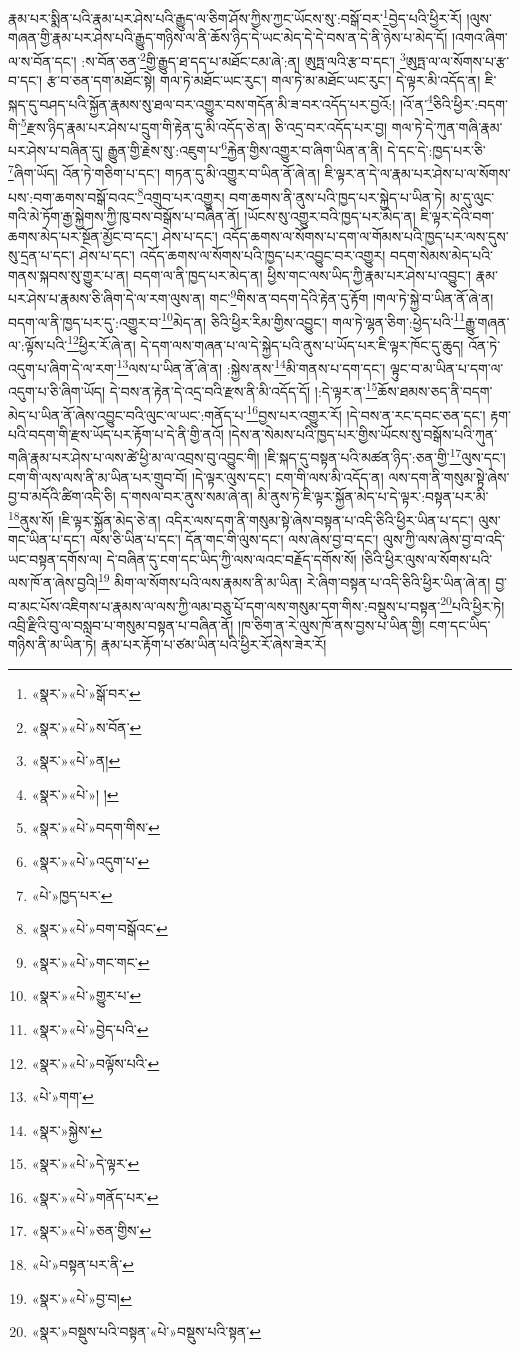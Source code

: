 རྣམ་པར་སྨིན་པའི་རྣམ་པར་ཤེས་པའི་རྒྱུད་ལ་ཅིག་ཤོས་ཀྱིས་ཀྱང་ཡོངས་སུ་:བསྒོ་བར་\footnote{«སྣར་»«པེ་»སྒོ་བར་}བྱེད་པའི་ཕྱིར་རོ། །ལུས་གཞན་གྱི་རྣམ་པར་ཤེས་པའི་རྒྱུད་གཉིས་ལ་ནི་ཆོས་ཉིད་དེ་ཡང་མེད་དེ་དེ་བས་ན་དེ་ནི་ཉེས་པ་མེད་དོ། །འགའ་ཞིག་ལ་ས་བོན་དང་། :ས་བོན་ཅན་\footnote{«སྣར་»«པེ་»ས་བོན་}གྱི་རྒྱུད་ཐ་དད་པ་མཐོང་ངམ་ཞེ་:ན། ཨུཏྤ་ལའི་རྩ་བ་དང་། \footnote{«སྣར་»«པེ་»ན།  }ཨུཏྤ་ལ་ལ་སོགས་པ་རྩ་བ་དང་། རྩ་བ་ཅན་དག་མཐོང་སྟེ། གལ་ཏེ་མཐོང་ཡང་རུང་། གལ་ཏེ་མ་མཐོང་ཡང་རུང་། དེ་ལྟར་མི་འདོད་ན། ཇི་སྐད་དུ་བཤད་པའི་སྐྱོན་རྣམས་སུ་ཐལ་བར་འགྱུར་བས་གདོན་མི་ཟ་བར་འདོད་པར་བྱའོ:། །འོ་ན་\footnote{«སྣར་»«པེ་»། །}ཅིའི་ཕྱིར་:བདག་གི་\footnote{«སྣར་»«པེ་»བདག་གིས་}རྫས་ཉིད་རྣམ་པར་ཤེས་པ་དྲུག་གི་རྟེན་དུ་མི་འདོད་ཅེ་ན། ཅི་འདྲ་བར་འདོད་པར་བྱ། གལ་ཏེ་དེ་ཀུན་གཞི་རྣམ་པར་ཤེས་པ་བཞིན་དུ། རྒྱུན་གྱི་རྗེས་སུ་:འཇུག་པ་\footnote{«སྣར་»«པེ་»འདུག་པ་}རྐྱེན་གྱིས་འགྱུར་བ་ཞིག་ཡིན་ན་ནི། དེ་དང་དེ་:ཁྱད་པར་ཅི་\footnote{«པེ་»ཁྱད་པར་}ཞིག་ཡོད། འོན་ཏེ་གཅིག་པ་དང་། གཏན་དུ་མི་འགྱུར་བ་ཡིན་ནོ་ཞེ་ན། ཇི་ལྟར་ན་དེ་ལ་རྣམ་པར་ཤེས་པ་ལ་སོགས་པས་:བག་ཆགས་བསྒོ་བའང་\footnote{«སྣར་»«པེ་»བག་བསྒོའང་}འགྲུབ་པར་འགྱུར། བག་ཆགས་ནི་ནུས་པའི་ཁྱད་པར་སྐྱེད་པ་ཡིན་ཏེ། མ་དུ་ལུང་གའི་མེ་ཏོག་རྒྱ་སྐྱེགས་ཀྱི་ཁུ་བས་བསྒོས་པ་བཞིན་ནོ། །ཡོངས་སུ་འགྱུར་བའི་ཁྱད་པར་མེད་ན། ཇི་ལྟར་དེའི་བག་ཆགས་མེད་པར་སྔོན་མྱོང་བ་དང་། ཤེས་པ་དང་། འདོད་ཆགས་ལ་སོགས་པ་དག་ལ་གོམས་པའི་ཁྱད་པར་ལས་དུས་སུ་དྲན་པ་དང་། ཤེས་པ་དང་། འདོད་ཆགས་ལ་སོགས་པའི་ཁྱད་པར་འབྱུང་བར་འགྱུར། བདག་སེམས་མེད་པའི་གནས་སྐབས་སུ་གྱུར་པ་ན། བདག་ལ་ནི་ཁྱད་པར་མེད་ན། ཕྱིས་གང་ལས་ཡིད་ཀྱི་རྣམ་པར་ཤེས་པ་འབྱུང་། རྣམ་པར་ཤེས་པ་རྣམས་ཅི་ཞིག་དེ་ལ་རག་ལུས་ན། གང་\footnote{«སྣར་»«པེ་»གང་གང་}གིས་ན་བདག་དེའི་རྟེན་དུ་རྟོག །གལ་ཏེ་སྐྱེ་བ་ཡིན་ནོ་ཞེ་ན། བདག་ལ་ནི་ཁྱད་པར་དུ་:འགྱུར་བ་\footnote{«སྣར་»«པེ་»གྱུར་པ་}མེད་ན། ཅིའི་ཕྱིར་རིམ་གྱིས་འབྱུང་། གལ་ཏེ་ལྷན་ཅིག་:ཕྱེད་པའི་\footnote{«སྣར་»«པེ་»བྱེད་པའི་}རྒྱུ་གཞན་ལ་:ལྟོས་པའི་\footnote{«སྣར་»«པེ་»བལྟོས་པའི་}ཕྱིར་རོ་ཞེ་ན། དེ་དག་ལས་གཞན་པ་ལ་དེ་སྐྱེད་པའི་ནུས་པ་ཡོད་པར་ཇི་ལྟར་ཁོང་དུ་ཆུད། འོན་ཏེ་འདུག་པ་ཞིག་དེ་ལ་རག་\footnote{«པེ་»གག་}ལས་པ་ཡིན་ནོ་ཞེ་ན། :སྐྱེས་ནས་\footnote{«སྣར་»སྐྱེས་}མི་གནས་པ་དག་དང་། ལྟུང་བ་མ་ཡིན་པ་དག་ལ་འདུག་པ་ཅི་ཞིག་ཡོད། དེ་བས་ན་རྟེན་དེ་འདྲ་བའི་རྫས་ནི་མི་འདོད་དོ། །:དེ་ལྟར་ན་\footnote{«སྣར་»«པེ་»དེ་ལྟར་}ཆོས་ཐམས་ཅད་ནི་བདག་མེད་པ་ཡིན་ནོ་ཞེས་འབྱུང་བའི་ལུང་ལ་ཡང་:གནོད་པ་\footnote{«སྣར་»«པེ་»གནོད་པར་}བྱས་པར་འགྱུར་རོ། །དེ་བས་ན་རང་དབང་ཅན་དང་། རྟག་པའི་བདག་གི་རྫས་ཡོད་པར་རྟོག་པ་དེ་ནི་གྱི་ནའོ། །དེས་ན་སེམས་པའི་ཁྱད་པར་གྱིས་ཡོངས་སུ་བསྒོས་པའི་ཀུན་གཞི་རྣམ་པར་ཤེས་པ་ལས་ཚེ་ཕྱི་མ་ལ་འབྲས་བུ་འབྱུང་གི། །ཇི་སྐད་དུ་བསྟན་པའི་མཚན་ཉིད་:ཅན་གྱི་\footnote{«སྣར་»«པེ་»ཅན་གྱིས་}ལུས་དང་། ངག་གི་ལས་ལས་ནི་མ་ཡིན་པར་གྲུབ་བོ། །དེ་ལྟར་ལུས་དང་། ངག་གི་ལས་མི་འདོད་ན། ལས་དག་ནི་གསུམ་སྟེ་ཞེས་བྱ་བ་མདོའི་ཚིག་འདི་ཅི། ད་གསལ་བར་ནུས་སམ་ཞེ་ན། མི་ནུས་ཏེ་ཇི་ལྟར་སྐྱོན་མེད་པ་དེ་ལྟར་:བསྟན་པར་མི་\footnote{«པེ་»བསྟན་པར་ནི་}ནུས་སོ། །ཇི་ལྟར་སྐྱོན་མེད་ཅེ་ན། འདིར་ལས་དག་ནི་གསུམ་སྟེ་ཞེས་བསྟན་པ་འདི་ཅིའི་ཕྱིར་ཡིན་པ་དང་། ལུས་གང་ཡིན་པ་དང་། ལས་ཅི་ཡིན་པ་དང་། དོན་གང་གི་ལུས་དང་། ལས་ཞེས་བྱ་བ་དང་། ལུས་ཀྱི་ལས་ཞེས་བྱ་བ་འདི་ཡང་བསྟན་དགོས་ལ། དེ་བཞིན་དུ་ངག་དང་ཡིད་ཀྱི་ལས་ལའང་བརྗོད་དགོས་སོ། །ཅིའི་ཕྱིར་ལུས་ལ་སོགས་པའི་ལས་ཁོ་ན་ཞེས་བྱའི།\footnote{«སྣར་»«པེ་»བྱ་བ།} མིག་ལ་སོགས་པའི་ལས་རྣམས་ནི་མ་ཡིན། རེ་ཞིག་བསྟན་པ་འདི་ཅིའི་ཕྱིར་ཡིན་ཞེ་ན། བྱ་བ་མང་པོས་འཇིགས་པ་རྣམས་ལ་ལས་ཀྱི་ལམ་བཅུ་པོ་དག་ལས་གསུམ་དག་གིས་:བསྡུས་པ་བསྟན་\footnote{«སྣར་»བསྡུས་པའི་བསྟན་«པེ་»བསྡུས་པའི་སྟན་}པའི་ཕྱིར་ཏེ། འབྲི་རྫིའི་བུ་ལ་བསླབ་པ་གསུམ་བསྟན་པ་བཞིན་ནོ། །ཁ་ཅིག་ན་རེ་ལུས་ཁོ་ནས་བྱས་པ་ཡིན་གྱི། ངག་དང་ཡིད་གཉིས་ནི་མ་ཡིན་ཏེ། རྣམ་པར་རྟོག་པ་ཙམ་ཡིན་པའི་ཕྱིར་རོ་ཞེས་ཟེར་རོ། 